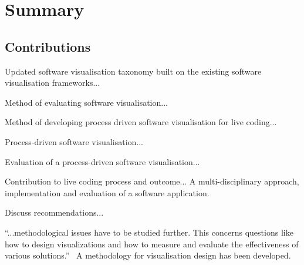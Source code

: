 
\chapter{Summary}
\label{chap:summary}


\section{Contributions}

Updated software visualisation taxonomy built on the existing software visualisation frameworks...

Method of evaluating software visualisation...

Method of developing process driven software visualisation for live coding...

Process-driven software visualisation...

Evaluation of a process-driven software visualisation...

Contribution to live coding process and outcome... A multi-disciplinary approach, implementation and evaluation of a software application.

Discuss recommendations...

``...methodological issues have to be studied further. This concerns questions like how to design visualizations and how to measure and evaluate the effectiveness of various solutions.''~\cite{VanWijk2005} A methodology for visualisation design has been developed.

